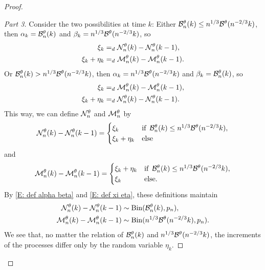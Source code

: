 \begin{proof}
\begin{proof}[Part 3]
Consider the two possibilities at time $k$:
Either $\mathcal{B}_n^{\theta}(k) \leq n^{1 / 3}\mathcal{B}^{\theta}(n^{-2 / 3}k)$,
then $\alpha_k = \mathcal{B}_n^{\theta}(k)$ and $\beta_k = n^{1 / 3}\mathcal{B}^{\theta}(n^{-2 / 3}k)$, 
so 
\begin{equation}
\begin{aligned}
\xi_k &=_d \mathcal{N}_n^{\theta}(k) - \mathcal{N}_n^{\theta}(k-1), \\
\xi_k + \eta_k &=_d \mathcal{M}_n^{\theta}(k) - \mathcal{M}_n^{\theta}(k-1).
\end{aligned}
\end{equation}
Or $\mathcal{B}_n^{\theta}(k) > n^{1 / 3}\mathcal{B}^{\theta}(n^{-2 / 3}k)$,
then $\alpha_k = n^{1 / 3}\mathcal{B}^{\theta}(n^{-2 / 3}k)$ and $\beta_k = \mathcal{B}_n^{\theta}(k)$, 
so
\begin{equation}
\begin{aligned}
\xi_k &=_d \mathcal{M}_n^{\theta}(k) - \mathcal{M}_n^{\theta}(k-1), \\
\xi_k + \eta_k &=_d \mathcal{N}_n^{\theta}(k) - \mathcal{N}_n^{\theta}(k-1).
\end{aligned}
\end{equation}
This way, we can define $\mathcal{N}_n^{\theta}$ and $\mathcal{M}_n^{\theta}$ by
\begin{equation}
\mathcal{N}_n^{\theta}(k) - \mathcal{N}_n^{\theta}(k-1) = 
\begin{cases}
\xi_k & \text{if} \enspace \mathcal{B}_n^{\theta}(k) \leq n^{1 / 3}\mathcal{B}^{\theta}(n^{-2 / 3}k), \\
\xi_k + \eta_k &\text{else}
\end{cases}
\end{equation}
and
\begin{equation}
\mathcal{M}_n^{\theta}(k) - \mathcal{M}_n^{\theta}(k-1) = 
\begin{cases}
\xi_k + \eta_k & \text{if} \enspace \mathcal{B}_n^{\theta}(k) \leq n^{1 / 3}\mathcal{B}^{\theta}(n^{-2 / 3}k), \\
\xi_k &\text{else}.
\end{cases}
\end{equation}
By \eqref{E: def alpha beta} and \eqref{E: def xi eta},
these definitions maintain
\begin{equation*}
\begin{aligned}
\mathcal{N}_n^{\theta}(k) - \mathcal{N}_n^{\theta}(k-1) &\sim \operatorname*{Bin}(\mathcal{B}_n^{\theta}(k), p_n), \\
\mathcal{M}_n^{\theta}(k) - \mathcal{M}_n^{\theta}(k-1) &\sim \operatorname*{Bin}(n^{1 / 3} \mathcal{B}^{\theta}(n^{-2 / 3}k), p_n).
\end{aligned}
\end{equation*}
We see that, no matter the relation of $\mathcal{B}_n^{\theta}(k)$ and $n^{1 / 3}\mathcal{B}^{\theta}(n^{-2 / 3}k)$, 
the increments of the processes differ only by the random variable $\eta_k$.


\end{proof}
\end{proof}
